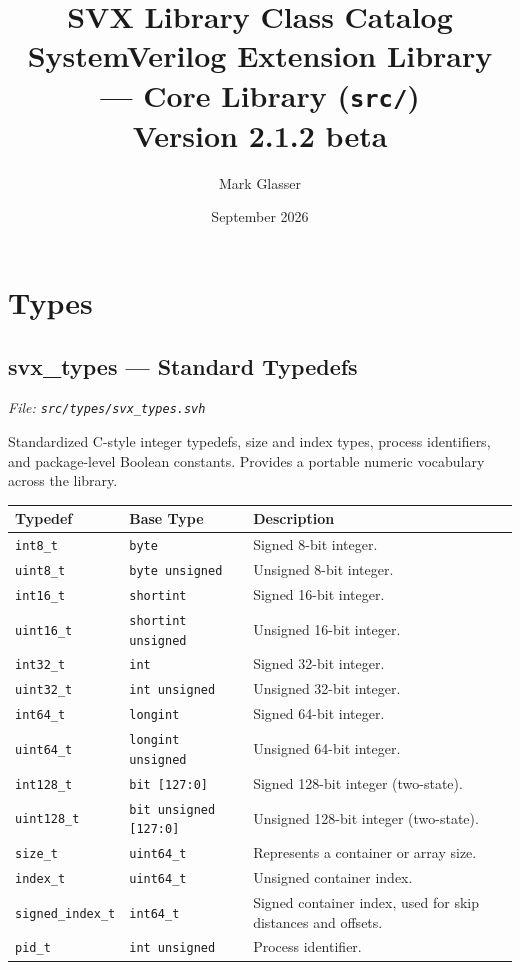 \documentclass[11pt,letterpaper]{report}
\title{\textbf{SVX Library Class Catalog}\\[0.5em]
       \large SystemVerilog Extension Library --- Core Library (\texttt{src/})\\[0.3em]
       \normalsize Version 2.1.2 beta}
\author{Mark Glasser}
\date{September 2026}
\begin{document}
\maketitle
\tableofcontents

\chapter{Types}
\section{svx\_types --- Standard Typedefs}
\noindent\small\textit{File: \texttt{src/types/svx\_types.svh}}\par

Standardized C-style integer typedefs, size and index types, process identifiers, and package-level Boolean constants. Provides a portable numeric vocabulary across the library.

\begin{xltabular}{\linewidth}{>{\small}p{1.5in} >{\small}p{1.5in} >{\small}X}
\toprule
\textbf{Typedef} & \textbf{Base Type} & \textbf{Description} \\
\midrule
\endhead
\bottomrule
\endfoot
\texttt{int8\_t} & \texttt{byte} & Signed 8-bit integer. \\
\texttt{uint8\_t} & \texttt{byte unsigned} & Unsigned 8-bit integer. \\
\texttt{int16\_t} & \texttt{shortint} & Signed 16-bit integer. \\
\texttt{uint16\_t} & \texttt{shortint unsigned} & Unsigned 16-bit integer. \\
\texttt{int32\_t} & \texttt{int} & Signed 32-bit integer. \\
\texttt{uint32\_t} & \texttt{int unsigned} & Unsigned 32-bit integer. \\
\texttt{int64\_t} & \texttt{longint} & Signed 64-bit integer. \\
\texttt{uint64\_t} & \texttt{longint unsigned} & Unsigned 64-bit integer. \\
\texttt{int128\_t} & \texttt{bit [127:0]} & Signed 128-bit integer (two-state). \\
\texttt{uint128\_t} & \texttt{bit unsigned [127:0]} & Unsigned 128-bit integer (two-state). \\
\texttt{size\_t} & \texttt{uint64\_t} & Represents a container or array size. \\
\texttt{index\_t} & \texttt{uint64\_t} & Unsigned container index. \\
\texttt{signed\_index\_t} & \texttt{int64\_t} & Signed container index, used for skip distances and offsets. \\
\texttt{pid\_t} & \texttt{int unsigned} & Process identifier. \\
\end{xltabular}
\end{document}
